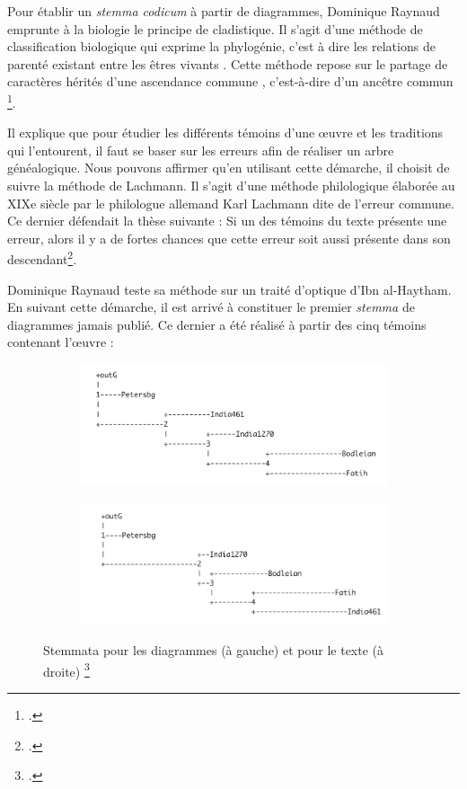 Pour établir un \textit{stemma codicum} à partir de diagrammes, Dominique Raynaud emprunte à la biologie le principe de cladistique.
Il s'agit \og d'une méthode de classification biologique qui exprime la phylogénie, c'est à dire les relations de parenté existant entre les êtres vivants \fg.
Cette méthode \og repose sur le partage de caractères hérités d'une ascendance commune \fg, c'est-à-dire d'un \og ancêtre commun \fg \footcite{tassyCLADISTIQUE2012}.

Il explique que pour étudier les différents témoins d'une œuvre et les traditions qui l'entourent, il faut se baser sur les erreurs afin de réaliser un arbre généalogique.
Nous pouvons affirmer qu'en utilisant cette démarche, il choisit de suivre la méthode de Lachmann.
Il s'agit d'une méthode philologique élaborée au XIXe siècle par le philologue allemand Karl Lachmann dite de l'erreur commune.
Ce dernier défendait la thèse suivante : Si un des témoins du texte présente une erreur, alors il y a de fortes chances que cette erreur soit aussi présente dans son descendant\footcite{pouliquenUsingLatticesReconstructing}.

Dominique Raynaud teste sa méthode sur un traité d'optique d'Ibn al-Haytham.
En suivant cette démarche, il est arrivé à constituer le premier \textit{stemma} de diagrammes jamais publié.
Ce dernier a été réalisé à partir des cinq témoins contenant l'œuvre :

\begin{figure}[h]
	\centering
	\begin{subfigure}{0.48\linewidth}
		\centering
		\includegraphics[width=\linewidth]{images/diagram_stemma.png}
	\end{subfigure}
	\hfill
	\begin{subfigure}{0.48\linewidth}
		\centering
		\includegraphics[width=\linewidth]{images/text_stemma.png}
	\end{subfigure}
	\caption{Stemmata pour les diagrammes (à gauche) et pour le texte (à droite) \footcite{raynaudBuildingStemmaCodicum2014}}
	\label{fig:stemma}
\end{figure}


